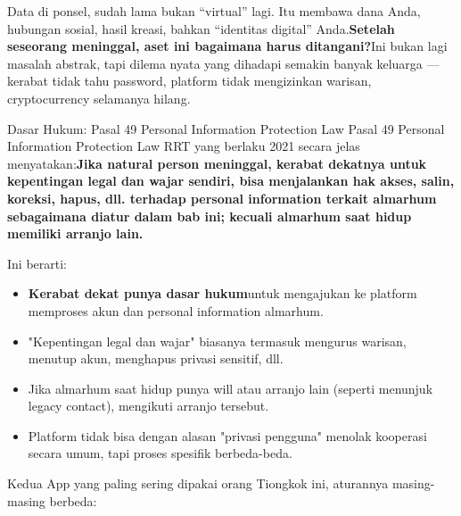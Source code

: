 
Data di ponsel, sudah lama bukan “virtual” lagi. Itu membawa dana Anda, hubungan sosial, hasil kreasi, bahkan “identitas digital” Anda.\textbf{Setelah seseorang meninggal, aset ini bagaimana harus ditangani?}Ini bukan lagi masalah abstrak, tapi dilema nyata yang dihadapi semakin banyak keluarga — kerabat tidak tahu password, platform tidak mengizinkan warisan, cryptocurrency selamanya hilang.

\begin{tcbinfo}{Dasar Hukum: Pasal 49 Personal Information Protection Law}
Pasal 49 Personal Information Protection Law RRT yang berlaku 2021 secara jelas menyatakan:\textbf{Jika natural person meninggal, kerabat dekatnya untuk kepentingan legal dan wajar sendiri, bisa menjalankan hak akses, salin, koreksi, hapus, dll. terhadap personal information terkait almarhum sebagaimana diatur dalam bab ini; kecuali almarhum saat hidup memiliki arranjo lain.}

Ini berarti:

\begin{itemize}
  \item \textbf{Kerabat dekat punya dasar hukum}untuk mengajukan ke platform memproses akun dan personal information almarhum.
  \item "Kepentingan legal dan wajar" biasanya termasuk mengurus warisan, menutup akun, menghapus privasi sensitif, dll.
  \item Jika almarhum saat hidup punya will atau arranjo lain (seperti menunjuk legacy contact), mengikuti arranjo tersebut.
  \item Platform tidak bisa dengan alasan "privasi pengguna" menolak kooperasi secara umum, tapi proses spesifik berbeda-beda.
\end{itemize}

\end{tcbinfo}


Kedua App yang paling sering dipakai orang Tiongkok ini, aturannya masing-masing berbeda:

